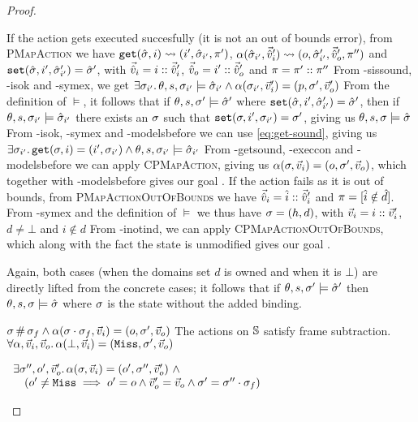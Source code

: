 \begin{proof}
\begin{hypvlist}
 If the action gets executed succesfully (it is not an out of bounds error), from \textsc{PMapAction} we have $\texttt{get}(\hat{\sigma},i)\rightsquigarrow(i',\hat{\sigma}_{i'},\pi')$, $\alpha(\hat{\sigma}_{i'},\vec{\hat{v}}_i')\rightsquigarrow(o,\hat{\sigma}'_{i'},\vec{\hat{v}}_o',\pi'')$ and ${\texttt{set}(\hat{\sigma},i',\hat{\sigma}'_{i'})=\hat{\sigma}'}$, with $\vec{\hat{v}}_i=i::\vec{\hat{v}}_i'$, $\vec{\hat{v}}_o=i'::\vec{\hat{v}}_o'$ and $\pi=\pi'::\pi''$
 From \hyp{sissound}, \hyp{isok} and \hyp{symex}, we get $\exists \sigma_{i'}\ldotp \theta,s,\sigma_{i'}\models\hat{\sigma}_{i'} \land \alpha(\sigma_{i'},\vec{v}_i')=(p,\sigma',\vec{v}_o')$
 From the definition of $\models$, it follows that if $\theta,s,\sigma'\models\hat{\sigma}'$ where $\texttt{set}(\hat{\sigma},i',\hat{\sigma}'_{i'})=\hat{\sigma}'$, then if $\theta,s,\sigma_{i'}\models\hat{\sigma}_{i'}$ there exists an $\sigma$ such that $\texttt{set}(\sigma,i',\sigma_{i'})=\sigma'$, giving us $\theta,s,\sigma\models\hat{\sigma}$
 From \hyp{isok}, \hyp{symex} and \hyp{modelsbefore} we can use \ref{eq:get-sound}, giving us ${\exists \sigma_{i'} \ldotp \texttt{get}(\sigma, i)=(i', \sigma_{i'})} \land \theta,s,\sigma_{i'} \models \hat{\sigma}_{i'}$
 From \hyp{getsound}, \hyp{execcon} and \hyp{modelsbefore} we can apply \textsc{CPMapAction}, giving us ${\alpha(\sigma,\vec{v}_i)=(o,\sigma',\vec{v}_o)}$, which together with \hyp{modelsbefore} gives our goal .
 If the action fails as it is out of bounds, from \textsc{PMapActionOutOfBounds} we have $\vec{\hat{v}}_i=\hat{i}::\vec{\hat{v}}_i'$ and $\pi=[\hat{i}\notin \hat{d}]$.
 From \hyp{symex} and the definition of $\models$ we thus have $\sigma=(h,d)$, with $\vec{v}_i=i::\vec{v}_i'$, $d\neq\bot$ and $i\notin d$
 From \hyp{inotind}, we can apply \textsc{CPMapActionOutOfBounds}, which along with the fact the state is unmodified gives our goal .
\end{hypvlist}

\pfcase{$\alpha=\alloc$}

Again, both cases (when the domains set $d$ is owned and when it is $\bot$) are directly lifted from the concrete cases; it follows that if $\theta,s,\sigma'\models\hat{\sigma}'$ then $\theta,s,\sigma\models\hat{\sigma}$ where $\sigma$ is the state without the added binding.


\pfassume \begin{hypvlist}
 $\sigma\operatorname{\#}\sigma_f \land \alpha(\sigma\cdot\sigma_f,\vec{v}_i)=(o,\sigma',\vec{v}_o)$
 The actions on $\mathbb S$ satisfy frame subtraction.
{\color{red} $\forall \alpha, \vec{v}_i, \vec{v}_o\ldotp \alpha(\bot,\vec{v}_i)=(\texttt{Miss},\sigma',\vec{v}_o)$}
\end{hypvlist}
\pfprove \begin{goalvlist}
 $\begin{array}{l}
\exists \sigma'', o', \vec{v}_o'\ldotp \alpha(\sigma,\vec{v}_i)=(o', \sigma'', \vec{v}_o') ~\land \\
\quad(o' \neq \texttt{Miss} \implies o' = o \land  \vec{v}_o' = \vec{v}_o \land \sigma' = \sigma'' \cdot \sigma_f)
\end{array}$
\end{goalvlist}


\end{proof}
